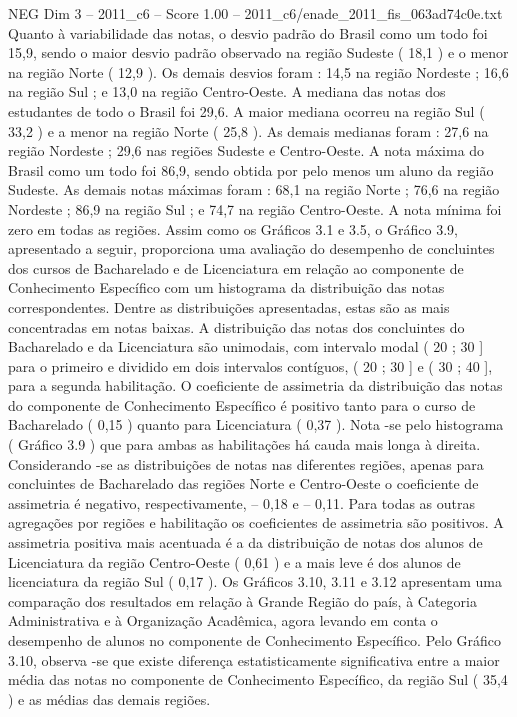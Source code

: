 \begin{textsample}{NEG Dim 3 – 2011\_c6 – Score 1.00 – 2011\_c6/enade\_2011\_fis\_063ad74c0e.txt}
Quanto à variabilidade das notas, o desvio padrão do Brasil como um todo foi 15,9, sendo o maior desvio padrão observado na região Sudeste ( 18,1 ) e o menor na região Norte ( 12,9 ).
Os demais desvios foram : 14,5 na região Nordeste ; 16,6 na região Sul ; e 13,0 na região Centro-Oeste.
A mediana das notas dos estudantes de todo o Brasil foi 29,6.
A maior mediana ocorreu na região Sul ( 33,2 ) e a menor na região Norte ( 25,8 ).
As demais medianas foram : 27,6 na região Nordeste ; 29,6 nas regiões Sudeste e Centro-Oeste.
A nota máxima do Brasil como um todo foi 86,9, sendo obtida por pelo menos um aluno da região Sudeste.
As demais notas máximas foram : 68,1 na região Norte ; 76,6 na região Nordeste ; 86,9 na região Sul ; e 74,7 na região Centro-Oeste.
A nota mínima foi zero em todas as regiões.
Assim como os Gráficos 3.1 e 3.5, o Gráfico 3.9, apresentado a seguir, proporciona uma avaliação do desempenho de concluintes dos cursos de Bacharelado e de Licenciatura em relação ao componente de Conhecimento Específico com um histograma da distribuição das notas correspondentes.
Dentre as distribuições apresentadas, estas são as mais concentradas em notas baixas.
A distribuição das notas dos concluintes do Bacharelado e da Licenciatura são unimodais, com intervalo modal ( 20 ; 30 ] para o primeiro e dividido em dois intervalos contíguos, ( 20 ; 30 ] e ( 30 ; 40 ], para a segunda habilitação.
O coeficiente de assimetria da distribuição das notas do componente de Conhecimento Específico é positivo tanto para o curso de Bacharelado ( 0,15 ) quanto para Licenciatura ( 0,37 ).
Nota -se pelo histograma ( Gráfico 3.9 ) que para ambas as habilitações há cauda mais longa à direita.
Considerando -se as distribuições de notas nas diferentes regiões, apenas para concluintes de Bacharelado das regiões Norte e Centro-Oeste o coeficiente de assimetria é negativo, respectivamente, – 0,18 e – 0,11.
Para todas as outras agregações por regiões e habilitação os coeficientes de assimetria são positivos.
A assimetria positiva mais acentuada é a da distribuição de notas dos alunos de Licenciatura da região Centro-Oeste ( 0,61 ) e a mais leve é dos alunos de licenciatura da região Sul ( 0,17 ).
Os Gráficos 3.10, 3.11 e 3.12 apresentam uma comparação dos resultados em relação à Grande Região do país, à Categoria Administrativa e à Organização Acadêmica, agora levando em conta o desempenho de alunos no componente de Conhecimento Específico.
Pelo Gráfico 3.10, observa -se que existe diferença estatisticamente significativa entre a maior média das notas no componente de Conhecimento Específico, da região Sul ( 35,4 ) e as médias das demais regiões.

\end{textsample}

